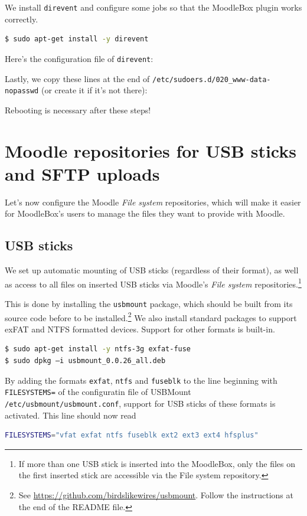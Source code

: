 \documentclass[12pt]{article}
\begin{document}
We install \lstinline{direvent} and configure some jobs so that the MoodleBox plugin works correctly.
\begin{lstlisting}[language=bash]
$ sudo apt-get install -y direvent
\end{lstlisting}
Here's the configuration file of \lstinline{direvent}:


Lastly, we copy these lines at the end of \lstinline{/etc/sudoers.d/020_www-data-nopasswd} (or create it if it's not there):


Rebooting is necessary after these steps!

\section{Moodle repositories for USB sticks and SFTP uploads}

Let's now configure the Moodle \textsl{File system} repositories, which will make it easier for MoodleBox's users to manage the files they want to provide with Moodle.

\subsection{USB sticks}

We set up automatic mounting of USB sticks (regardless of their format), as well as access to all files on inserted USB sticks via Moodle's \textsl{File system} repositories.\footnote{If more than one USB stick is inserted into the MoodleBox, only the files on the first inserted stick are accessible via the File system repository.}

This is done by installing the \lstinline{usbmount} package, which should be built from its source code before to be installed.\footnote{See \url{https://github.com/birdslikewires/usbmount}. Follow the instructions at the end of the README file.}
We also install standard packages to support exFAT and NTFS formatted devices. Support for other formats is built-in.

\begin{lstlisting}[language=bash]
$ sudo apt-get install -y ntfs-3g exfat-fuse
$ sudo dpkg –i usbmount_0.0.26_all.deb
\end{lstlisting}
By adding the formats \lstinline{exfat}, \lstinline{ntfs} and \lstinline{fuseblk} to the line beginning with \lstinline{FILESYSTEMS=} of the configuratin file of USBMount \lstinline{/etc/usbmount/usbmount.conf}, support for USB sticks of these formats is activated.
This line should now read
\begin{lstlisting}[language=bash]
FILESYSTEMS="vfat exfat ntfs fuseblk ext2 ext3 ext4 hfsplus"
\end{lstlisting}
\end{document}
